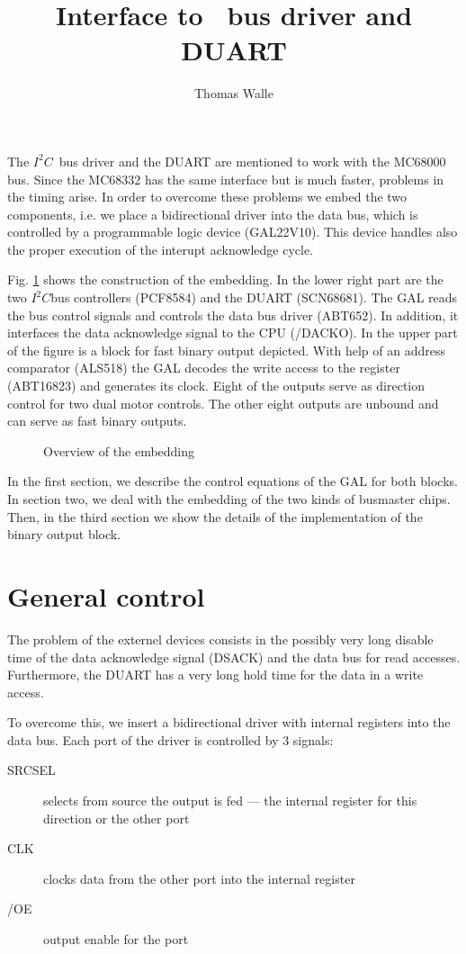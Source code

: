 \documentclass[12pt]{article}
\title{Interface to \isc\ bus driver and DUART}
\author{Thomas Walle}
\newcommand{\bd}{\begin{description}}
\newcommand{\ed}{\end{description}}
\newcommand{\isc}{$I^2C$}
\newcommand{\myfig}[4]{%
  \begin{figure}[htbp] \begin{center}%
  \makebox{\epsfysize=#2 \epsfbox{#1}} \caption{\label{#3} #4}%
  \end{center} \end{figure}}
\begin{document}
\maketitle

The \isc\ bus driver and the DUART are mentioned to work with the MC68000 bus.
Since the MC68332 has the same interface but is much faster, problems in the
timing arise. In order to overcome these problems we embed the two
components, i.e. we place a bidirectional driver into the data bus, which is
controlled by a programmable logic device (GAL22V10). This device handles
also the proper execution of the interupt acknowledge cycle.

Fig. \ref{bus-embed} shows the construction of the embedding. In the lower
right part are the two \isc bus controllers (PCF8584) and the DUART 
(SCN68681). The GAL reads the bus control signals and controls the data bus
driver (ABT652). In addition, it interfaces the data acknowledge signal
to the CPU (/DACKO). In the upper part of the figure is a block for fast
binary output depicted. With help of an address comparator (ALS518) the GAL
decodes the write access to the register (ABT16823) and generates its clock.
Eight of the outputs serve as direction control for two dual motor controls.
The other eight outputs are unbound and can serve as fast binary outputs.

\myfig{bus-embed.eps}{150mm}{bus-embed}{Overview of the embedding}

In the first section, we describe the control equations of the GAL for both
blocks. In section two, we deal with the embedding of the two kinds of 
busmaster chips. Then, in the third section we show the details of the 
implementation of the binary output block.

\section{General control}

The problem of the externel devices consists in the possibly very long
disable time of the data acknowledge signal (DSACK) and the data bus for
read accesses. Furthermore, the DUART has a very long hold time for the
data in a write access.

To overcome this, we insert a bidirectional driver with internal registers
into the data bus. Each port of the driver is controlled by 3 signals:

\bd
\item[SRCSEL] selects from source the output is fed --- the internal
  register for this direction or the other port
\item[CLK] clocks data from the other port into the internal register
\item[/OE] output enable for the port
\ed
\end{document}
